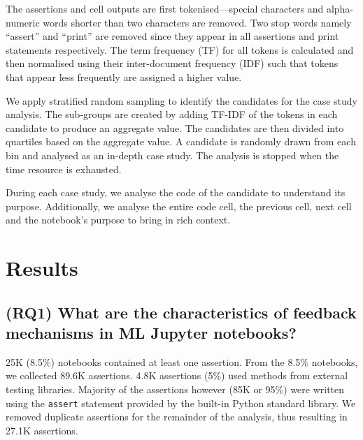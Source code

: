 The assertions and cell outputs are first tokenised---special characters and alpha-numeric words shorter than two characters are removed. Two stop words namely ``assert'' and ``print'' are removed since they appear in all assertions and print statements respectively. The term frequency (TF) for all tokens is calculated and then normalised using their inter-document frequency (IDF) such that tokens that appear less frequently are assigned a higher value.

We apply stratified random sampling to identify the candidates for the case study analysis. The sub-groups are created by adding TF-IDF of the tokens in each candidate to produce an aggregate value. The candidates are then divided into quartiles based on the aggregate value. A candidate is randomly drawn from each bin and analysed as an in-depth case study. The analysis is stopped when the time resource is exhausted.

During each case study, we analyse the code of the candidate to understand its purpose. Additionally, we analyse the entire code cell, the previous cell, next cell and the notebook's purpose to bring in rich context.

\section{Results}


\subsection{(RQ1) What are the characteristics of feedback mechanisms in ML Jupyter notebooks?}

25K (8.5\%) notebooks contained at least one assertion. From the 8.5\% notebooks, we collected 89.6K assertions. 4.8K assertions (5\%) used methods from external testing libraries. Majority of the assertions however (85K or 95\%) were written using the \lstinline{assert} statement provided by the built-in Python standard library. We removed duplicate assertions for the remainder of the analysis, thus resulting in 27.1K assertions.

